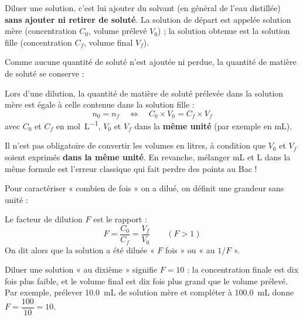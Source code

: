 \documentclass[11pt]{article}
\newcommand{\cle}[1]{{\popxbold\color{popdark}#1}}
\newcounter{popsec}
\newcounter{popsub}
\newcommand{\courssub}[1]{%
  \stepcounter{popsub}%
  \par\vspace{9pt}\noindent{\popxbold\fontsize{11.5}{13}\selectfont\color{popink}{\color{poporange}\thepopsec.\thepopsub}\hspace{6pt}#1}\par\nopagebreak\vspace{4pt}
}
\begin{document}
\begin{definition}[Dilution]
\cle{Diluer} une solution, c'est lui ajouter du \cle{solvant} (en général de l'eau distillée) \textbf{sans ajouter ni retirer de soluté}. La solution de départ est appelée \cle{solution mère} (concentration $C_0$, volume prélevé $V_0$) ; la solution obtenue est la \cle{solution fille} (concentration $C_f$, volume final $V_f$).
\end{definition}

Comme aucune quantité de soluté n'est ajoutée ni perdue, la quantité de matière de soluté se conserve :

\begin{propriete}
Lors d'une dilution, la quantité de matière de soluté prélevée dans la solution mère est égale à celle contenue dans la solution fille :
\[ n_0 = n_f \quad \Longleftrightarrow \quad \boxed{C_0 \times V_0 = C_f \times V_f} \]
avec $C_0$ et $C_f$ en \si{mol.L^{-1}}, $V_0$ et $V_f$ dans la \textbf{même unité} (par exemple en \si{mL}).
\end{propriete}

\begin{attention}
Il n'est pas obligatoire de convertir les volumes en litres, à condition que $V_0$ et $V_f$ soient exprimés \textbf{dans la même unité}. En revanche, mélanger \si{mL} et \si{L} dans la même formule est l'erreur classique qui fait perdre des points au Bac !
\end{attention}

\courssub{Le facteur de dilution}

Pour caractériser « combien de fois » on a dilué, on définit une grandeur sans unité :

\begin{definition}
Le \cle{facteur de dilution} $F$ est le rapport :
\[ F = \frac{C_0}{C_f} = \frac{V_f}{V_0} \qquad (F > 1) \]
On dit alors que la solution a été diluée « $F$ fois » ou « au $1/F$ ».
\end{definition}

\begin{exemplebox}
Diluer une solution « au dixième » signifie $F = 10$ : la concentration finale est dix fois plus faible, et le volume final est dix fois plus grand que le volume prélevé. Par exemple, prélever \SI{10,0}{mL} de solution mère et compléter à \SI{100,0}{mL} donne $F = \dfrac{100}{10} = 10$.
\end{exemplebox}
\end{document}
